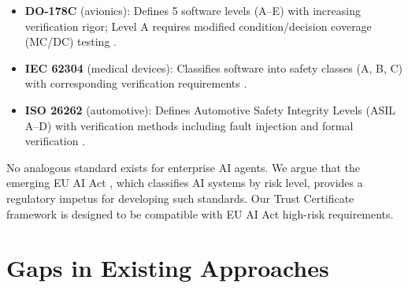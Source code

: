 \documentclass[11pt,a4paper]{article}
\begin{document}
\begin{itemize}
  \item \textbf{DO-178C} (avionics): Defines 5 software levels
    (A--E) with increasing verification rigor; Level A requires
    modified condition/decision coverage (MC/DC) testing
    \citep{rierson2017developing}.

  \item \textbf{IEC 62304} (medical devices): Classifies software
    into safety classes (A, B, C) with corresponding verification
    requirements \citep{iec62304}.

  \item \textbf{ISO 26262} (automotive): Defines Automotive Safety
    Integrity Levels (ASIL A--D) with verification methods including
    fault injection and formal verification \citep{iso26262}.
\end{itemize}

No analogous standard exists for enterprise AI agents. We argue that
the emerging EU AI Act \citep{euaiact2024}, which classifies AI
systems by risk level, provides a regulatory impetus for developing
such standards. Our Trust Certificate framework is designed to
be compatible with EU AI Act high-risk requirements.

\section{Gaps in Existing Approaches}
\label{sec:gaps}
\end{document}
